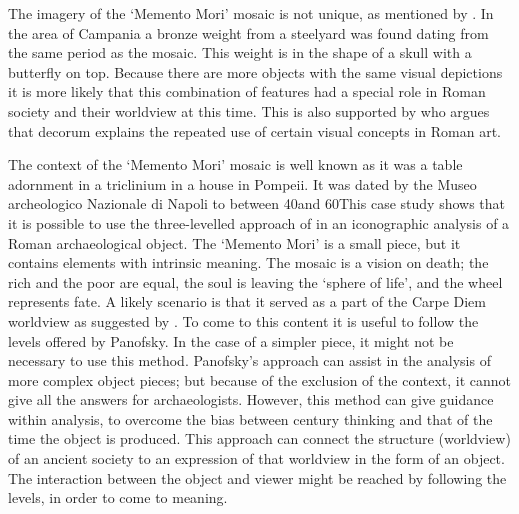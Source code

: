 The imagery of the ‘Memento Mori’ mosaic is not unique, as mentioned by \textcite[99--100] {Cuomo_2007}. 
In the area of Campania a bronze weight from a steelyard was found dating from the same period as the mosaic. This weight is in the shape of a skull with a butterfly on top. Because there are more objects with the same visual depictions it is more likely that this combination of features had a special role in Roman society and their worldview at this time. 
This is also supported by \textcite{Perry_2005}  who argues that decorum explains the repeated use of certain visual concepts in Roman art. 
	
The context of the ‘Memento Mori’ mosaic is well known as it was a table adornment in a triclinium in a house in Pompeii. It was dated by the Museo archeologico Nazionale di Napoli to between 40\AD and 60\AD This case study shows that it is possible to use the three-levelled approach of \textcite{Panofsky_1939}  in an iconographic analysis of a Roman archaeological object. The ‘Memento Mori’ is a small piece, but it contains elements with intrinsic meaning. The mosaic is a vision on death; the rich and the poor are equal, the soul is leaving the ‘sphere of life’, and the wheel represents fate. A likely scenario is that it served as a part of the Carpe Diem worldview as suggested by \textcite {Hope_2009}. To come to this content it is useful to follow the levels offered by Panofsky. 
In the case of a simpler piece, it might not be necessary to use this method. Panofsky’s approach can assist in the analysis of more complex object pieces; but because of the exclusion of the context, it cannot give all the answers for archaeologists. However, this method can give guidance within analysis, to overcome the bias between  century thinking and that of the time the object is produced. 
This approach can connect the structure (worldview) of an ancient society to an expression of that worldview in the form of an object. The interaction between the object and viewer might be reached by following the levels, in order to come to meaning.

